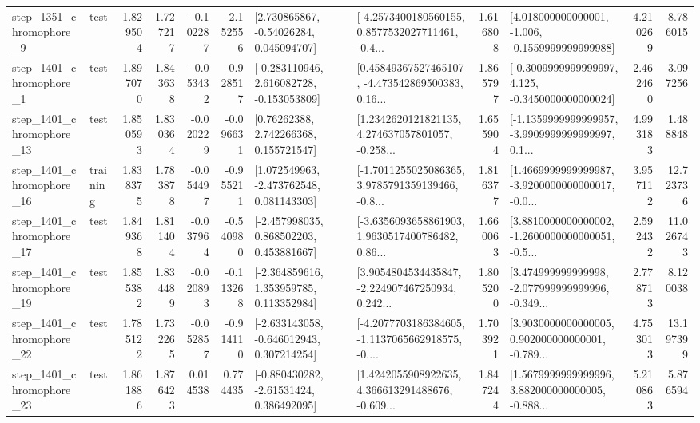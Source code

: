 \begin{tabular}{llrrrrllrlrr}
  step\_1351\_chromophore\_9 &      test &      1.829504 &    1.727217 &     -0.102287 & -2.152556 &     [2.730865867, -0.54026284, 0.045094707] &  [-4.2573400180560155, 0.8577532027711461, -0.4... &       1.616808 &   [4.018000000000001, -1.006, -0.1559999999999988] &            4.210269 &          8.786015 \\
  step\_1401\_chromophore\_1 &      test &      1.897070 &    1.843638 &     -0.053432 & -0.928517 &   [-0.283110946, 2.616082728, -0.153053809] &  [0.45849367527465107, -4.473542869500383, 0.16... &       1.865797 &  [-0.3009999999999997, 4.125, -0.3450000000000024] &            2.462460 &          3.097256 \\
 step\_1401\_chromophore\_13 &      test &      1.850593 &    1.830364 &     -0.020229 & -0.096631 &      [0.76262388, 2.742266368, 0.155721547] &  [1.2342620121821135, 4.274637057801057, -0.258... &       1.655904 &  [-1.1359999999999957, -3.9909999999999997, 0.1... &            4.993183 &          1.488848 \\
 step\_1401\_chromophore\_16 &  training &      1.838375 &    1.783878 &     -0.054497 & -0.955211 &    [1.072549963, -2.473762548, 0.081143303] &  [-1.7011255025086365, 3.9785791359139466, -0.8... &       1.816377 &  [1.4669999999999987, -3.9200000000000017, -0.0... &            3.957112 &         12.723736 \\
 step\_1401\_chromophore\_17 &      test &      1.849368 &    1.811404 &     -0.037964 & -0.540980 &    [-2.457998035, 0.868502203, 0.453881667] &  [-3.6356093658861903, 1.9630517400786482, 0.86... &       1.660063 &  [3.8810000000000002, -1.2600000000000051, -0.5... &            2.592432 &         11.026743 \\
 step\_1401\_chromophore\_19 &      test &      1.855382 &    1.834489 &     -0.020893 & -0.113268 &    [-2.364859616, 1.353959785, 0.113352984] &  [3.9054804534435847, -2.224907467250934, 0.242... &       1.805200 &  [3.474999999999998, -2.077999999999996, -0.349... &            2.778713 &          8.120038 \\
 step\_1401\_chromophore\_22 &      test &      1.785122 &    1.732265 &     -0.052857 & -0.914110 &   [-2.633143058, -0.646012943, 0.307214254] &  [-4.2077703186384605, -1.1137065662918575, -0.... &       1.703921 &  [3.9030000000000005, 0.902000000000001, -0.789... &            4.753013 &         13.197399 \\
 step\_1401\_chromophore\_23 &      test &      1.861886 &    1.876423 &      0.014538 &  0.774435 &    [-0.880430282, -2.61531424, 0.386492095] &  [1.4242055908922635, 4.366613291488676, -0.609... &       1.847244 &  [1.5679999999999996, 3.882000000000005, -0.888... &            5.210863 &          5.876594 \\

\end{tabular}
